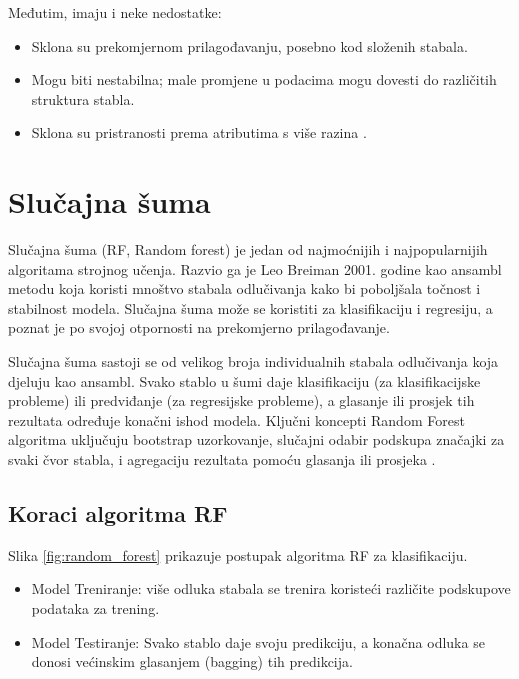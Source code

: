 \documentclass[zavrsnirad,upload]{fer}
\begin{document}
Međutim, imaju i neke nedostatke:
\begin{itemize}
	\item Sklona su prekomjernom prilagođavanju, posebno kod složenih stabala.
	\item Mogu biti nestabilna; male promjene u podacima mogu dovesti do različitih struktura stabla.
	\item Sklona su pristranosti prema atributima s više razina \cite{Charbuty_Abdulazeez_2021}\cite{somvanshi2016}.
\end{itemize}



\section{Slučajna šuma}
Slučajna šuma (RF, Random forest) je jedan od najmoćnijih i najpopularnijih algoritama strojnog učenja. Razvio ga je Leo Breiman 2001. godine \cite{geeksforgeeks2021} kao ansambl metodu koja koristi mnoštvo stabala odlučivanja kako bi poboljšala točnost i stabilnost modela. Slučajna šuma može se koristiti za klasifikaciju i regresiju, a poznat je po svojoj otpornosti na prekomjerno prilagođavanje.

Slučajna šuma sastoji se od velikog broja individualnih stabala odlučivanja koja djeluju kao ansambl. Svako stablo u šumi daje klasifikaciju (za klasifikacijske probleme) ili predviđanje (za regresijske probleme), a glasanje ili prosjek tih rezultata određuje konačni ishod modela. Ključni koncepti Random Forest algoritma uključuju bootstrap uzorkovanje, slučajni odabir podskupa značajki za svaki čvor stabla, i agregaciju rezultata pomoću glasanja ili prosjeka \cite{geeksforgeeks2021}.

\subsection{Koraci algoritma RF}
Slika \ref{fig:random_forest} prikazuje postupak algoritma RF za klasifikaciju.
\begin{itemize} 
	\item Model Treniranje: više odluka stabala se trenira koristeći različite podskupove podataka za trening.
	\item Model Testiranje: Svako stablo daje svoju predikciju, a konačna odluka se donosi većinskim glasanjem (bagging) tih predikcija.
\end{itemize}
\end{document}
